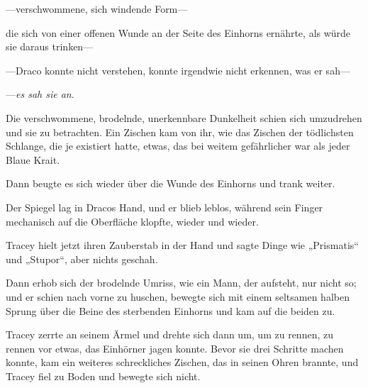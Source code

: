 —verschwommene, sich windende Form—

die sich von einer offenen Wunde an der Seite des Einhorns ernährte, als würde sie daraus trinken—

—Draco konnte nicht verstehen, konnte irgendwie nicht erkennen, was er sah—

—\emph{es sah sie an}.

Die verschwommene, brodelnde, unerkennbare Dunkelheit schien sich umzudrehen und sie zu betrachten. Ein Zischen kam von ihr, wie das Zischen der tödlichsten Schlange, die je existiert hatte, etwas, das bei weitem gefährlicher war als jeder Blaue Krait.

Dann beugte es sich wieder über die Wunde des Einhorns und trank weiter.

Der Spiegel lag in Dracos Hand, und er blieb leblos, während sein Finger mechanisch auf die Oberfläche klopfte, wieder und wieder.

Tracey hielt jetzt ihren Zauberstab in der Hand und sagte Dinge wie „Prismatis“ und „Stupor“, aber nichts geschah.

Dann erhob sich der brodelnde Umriss, wie ein Mann, der aufsteht, nur nicht so; und er schien nach vorne zu huschen, bewegte sich mit einem seltsamen halben Sprung über die Beine des sterbenden Einhorns und kam auf die beiden zu.

Tracey zerrte an seinem Ärmel und drehte sich dann um, um zu rennen, zu rennen vor etwas, das Einhörner jagen konnte. Bevor sie drei Schritte machen konnte, kam ein weiteres schreckliches Zischen, das in seinen Ohren brannte, und Tracey fiel zu Boden und bewegte sich nicht.

